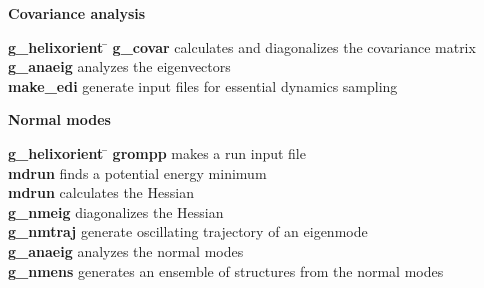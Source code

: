 \begin{description}
\item {\large\bf Covariance analysis}
\vspace{-2ex}\begin{tabbing}
{\bf g_helixorient} \= \kill
{\bf g_covar} \> calculates and diagonalizes the covariance matrix \\
{\bf g_anaeig} \> analyzes the eigenvectors \\
{\bf make_edi} \> generate input files for essential dynamics sampling \\
\end{tabbing}\vspace{-2ex}

\item {\large\bf Normal modes}
\vspace{-2ex}\begin{tabbing}
{\bf g_helixorient} \= \kill
{\bf grompp} \> makes a run input file \\
{\bf mdrun} \> finds a potential energy minimum \\
{\bf mdrun} \> calculates the Hessian \\
{\bf g_nmeig} \> diagonalizes the Hessian  \\
{\bf g_nmtraj} \> generate oscillating trajectory of an eigenmode \\
{\bf g_anaeig} \> analyzes the normal modes \\
{\bf g_nmens} \> generates an ensemble of structures from the normal modes \\
\end{tabbing}\vspace{-2ex}

\end{description}

